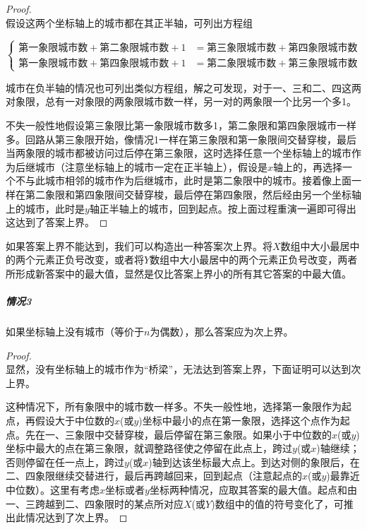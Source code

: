 \documentclass[UTF8]{ctexart}
\theoremstyle{nonumberplain}
\newtheorem{proof}{\hspace{1em}证明：}
\begin{document}
			\begin{proof}\mbox{}\\
			
				假设这两个坐标轴上的城市都在其正半轴，可列出方程组
				
				$$\left\{\begin{aligned}
					\mbox{第一象限城市数}+\mbox{第二象限城市数}+1&=\mbox{第三象限城市数}+\mbox{第四象限城市数}\\
					\mbox{第一象限城市数}+\mbox{第四象限城市数}+1&=\mbox{第二象限城市数}+\mbox{第三象限城市数}
				\end{aligned}\right.$$
				
				城市在负半轴的情况也可列出类似方程组，解之可发现，对于一、三和二、四这两对象限，总有一对象限的两象限城市数一样，另一对的两象限一个比另一个多1。
				
				不失一般性地假设第三象限比第一象限城市数多1，第二象限和第四象限城市一样多。回路从第三象限开始，像情况1一样在第三象限和第一象限间交替穿梭，最后当两象限的城市都被访问过后停在第三象限，这时选择任意一个坐标轴上的城市作为后继城市（注意坐标轴上的城市一定在正半轴上），假设是$x$轴上的，再选择一个不与此城市相邻的城市作为后继城市，此时是第二象限中的城市。接着像上面一样在第二象限和第四象限间交替穿梭，最后停在第四象限，然后经由另一个坐标轴上的城市，此时是$y$轴正半轴上的城市，回到起点。按上面过程重演一遍即可得出这达到了答案上界。
			\end{proof}
			
			如果答案上界不能达到，我们可以构造出一种答案次上界。将$X$数组中大小最居中的两个元素正负号改变，或者将$Y$数组中大小最居中的两个元素正负号改变，两者所形成新答案中的最大值，显然是仅比答案上界小的所有其它答案的中最大值。
			
			\subparagraph{情况3}
			如果坐标轴上没有城市（等价于$n$为偶数），那么答案应为次上界。
			
			\begin{proof}\mbox{}\\
			
				显然，没有坐标轴上的城市作为“桥梁”，无法达到答案上界，下面证明可以达到次上界。
				
				这种情况下，所有象限中的城市数一样多。不失一般性地，选择第一象限作为起点，再假设大于中位数的$x$(或$y$)坐标中最小的点在第一象限，选择这个点作为起点。先在一、三象限中交替穿梭，最后停留在第三象限。如果小于中位数的$x$(或$y$)坐标中最大的点在第三象限，就调整路径使之停留在此点上，跨过$y$(或$x$)轴继续；否则停留在任一点上，跨过$y$(或$x$)轴到达该坐标最大点上。到达对侧的象限后，在二、四象限继续交替进行，最后再跨越回来，回到起点（注意起点的$x$(或$y$)最靠近中位数）。这里有考虑$x$坐标或者$y$坐标两种情况，应取其答案的最大值。起点和由一、三跨越到二、四象限时的某点所对应$X$(或$Y$)数组中的值的符号变化了，可推出此情况达到了次上界。
			\end{proof}
			
\end{document}
